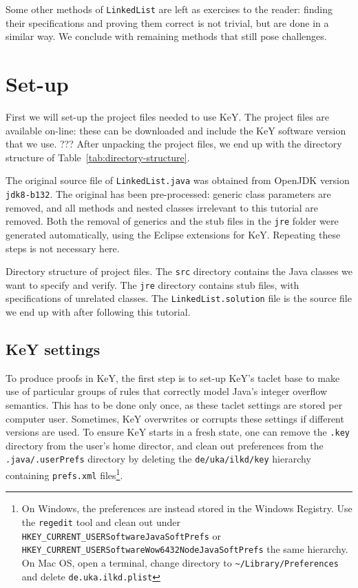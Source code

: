 \documentclass[runningheads]{llncs}
\def\bs{\char092}
\begin{document}
Some other methods of \texttt{LinkedList} are left as exercises to the reader: finding their specifications and proving them correct is not trivial, but are done in a similar way. We conclude with remaining methods that still pose challenges.

\section{Set-up}\label{sec:setup}

First we will set-up the project files needed to use KeY. The project files are available on-line: these can be downloaded and include the KeY software version that we use. ??? After unpacking the project files, we end up with the directory structure of Table~\ref{tab:directory-structure}.

The original source file of \texttt{LinkedList.java} was obtained from OpenJDK version \texttt{jdk8-b132}. The original has been pre-processed: generic class parameters are removed, and all methods and nested classes irrelevant to this tutorial are removed. Both the removal of generics and the stub files in the \texttt{jre} folder were generated automatically, using the Eclipse extensions for KeY. Repeating these steps is not necessary here.

\begin{table}[]
\medskip
    \caption{Directory structure of project files. The \texttt{src} directory contains the Java classes we want to specify and verify. The \texttt{jre} directory contains stub files, with specifications of unrelated classes. The \texttt{LinkedList.solution} file is the source file we end up with after following this tutorial.}
    \label{tab:directory-structure}
\end{table}

\subsection{KeY settings}

To produce proofs in KeY, the first step is to set-up KeY's taclet base to make use of particular groups of rules that correctly model Java's integer overflow semantics. This has to be done only once, as these taclet settings are stored per computer user. Sometimes, KeY overwrites or corrupts these settings if different versions are used. To ensure KeY starts in a fresh state, one can remove the \texttt{.key} directory from the user's home director, and clean out preferences from the \texttt{.java/.userPrefs} directory by deleting the \texttt{de/uka/ilkd/key} hierarchy containing \texttt{prefs.xml} files\footnote{On Windows, the preferences are instead stored in the Windows Registry. Use the \texttt{regedit} tool and clean out under \texttt{HKEY\_CURRENT\_USER\bs Software\bs JavaSoft\bs Prefs} or \texttt{HKEY\_CURRENT\_USER\bs Software\bs Wow6432Node\bs JavaSoft\bs Prefs} the same hierarchy. On Mac OS, open a terminal, change directory to \texttt{\textasciitilde/Library/Preferences} and delete \texttt{de.uka.ilkd.plist}}.
\end{document}

